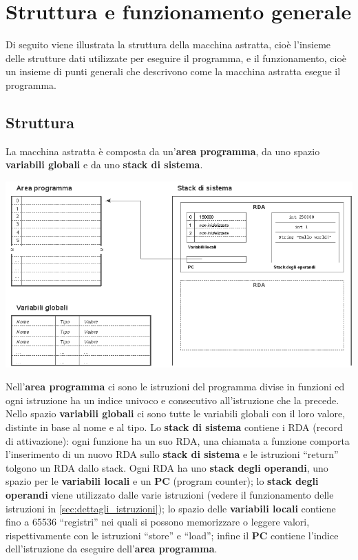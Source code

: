 \section{Struttura e funzionamento generale}
\label{sec:struttura_e_funazionamento_generale}
Di seguito viene illustrata la struttura della macchina astratta, cio\`e l'insieme delle strutture dati utilizzate per eseguire il programma, e il funzionamento, cio\`e un insieme di punti generali che descrivono come la macchina astratta esegue il programma.

\subsection{Struttura}
La macchina astratta \`e composta da un'\textbf{area programma}, da uno spazio \textbf{variabili globali} e da uno \textbf{stack di sistema}.
\begin{center}
\includegraphics[width=\columnwidth]{graphics/struttura_generale.png}
\end{center}
Nell'\textbf{area programma} ci sono le istruzioni del programma divise in funzioni ed ogni istruzione ha un indice univoco e consecutivo all'istruzione che la precede. Nello spazio \textbf{variabili globali} ci sono tutte le variabili globali con il loro valore, distinte in base al nome e al tipo. Lo \textbf{stack di sistema} contiene i RDA (record di attivazione): ogni funzione ha un suo RDA, una chiamata a funzione comporta l'inserimento di un nuovo RDA sullo \textbf{stack di sistema} e le istruzioni ``return'' tolgono un RDA dallo stack. Ogni RDA ha uno \textbf{stack degli operandi}, uno spazio per le \textbf{variabili locali} e un \textbf{PC} (program counter); lo \textbf{stack degli operandi} viene utilizzato dalle varie istruzioni (vedere il funzionamento delle istruzioni in \ref{sec:dettagli_istruzioni}); lo spazio delle \textbf{variabili locali} contiene fino a 65536 ``registri'' nei quali si possono memorizzare o leggere valori, rispettivamente con le istruzioni ``store'' e ``load''; infine il \textbf{PC} contiene l'indice dell'istruzione da eseguire dell'\textbf{area programma}.


